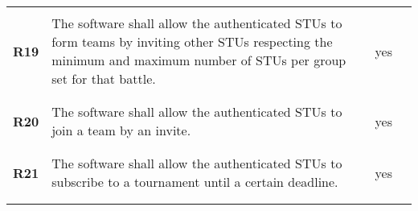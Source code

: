 \begin{longtable}[H]{l p{6.5cm} l p{3cm}}
                 &                                                                                                                                                                                                                       &                      &                                                                                         \\\hline & & & \\
    \textbf{R19} & The software shall allow the authenticated STUs to form teams by inviting other STUs respecting the minimum and maximum number of STUs per group set for that battle.                                                 & {\color{green}yes}   &                                                                                         \\
                 &                                                                                                                                                                                                                       &                      &                                                                                         \\\hline & & & \\
    \textbf{R20} & The software shall allow the authenticated STUs to join a team by an invite.                                                                                                                                          & {\color{green}yes}   &                                                                                         \\
                 &                                                                                                                                                                                                                       &                      &                                                                                         \\\hline & & & \\
    \textbf{R21} & The software shall allow the authenticated STUs to subscribe to a tournament until a certain deadline.                                                                                                                & {\color{green}yes}   &                                                                                         \\
                 &                                                                                                                                                                                                                       &                      &                                                                                         \\\hline & & & \\

\end{longtable}
